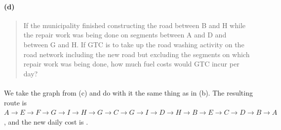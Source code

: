 \paragraph{(d)}
\begin{quote}
If the municipality finished constructing the road between B and H while the repair work was being done on segments between A and D and between G and H. If GTC is to take up the road washing activity on the road network including the new road but excluding the segments on which repair work was being done, how much fuel costs would GTC incur per day?
\end{quote}

\paragraph{}
We take the graph from (c) and do with it the same thing as in (b). The resulting route is $A \rightarrow E \rightarrow F \rightarrow G \rightarrow I \rightarrow H \rightarrow G \rightarrow C \rightarrow G \rightarrow I \rightarrow D \rightarrow H \rightarrow B \rightarrow E \rightarrow C \rightarrow D \rightarrow B \rightarrow A$, and the new daily cost is .
